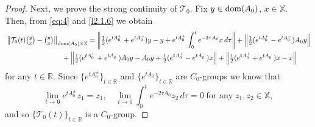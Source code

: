 \documentclass[11pt]{amsart}
\numberwithin{equation}{section}
\newcommand{\RR}{{\mathbb R}}
\theoremstyle{remark}
\theoremstyle{definition}
\newcommand\cT{{\mathcal T}}
\newcommand\bX{{\mathbb X}}
\newcommand{\dom}{\text{\rm{dom}}}
\begin{document}
\begin{proof}
	Next, we prove the strong continuity of $\cT_0$. Fix $y\in\dom(A_0)$, $x\in \bX$. Then, from \eqref{eq:4} and \eqref{l2.1.6} we obtain 
	\begin{align}\label{2.1.14}
		&\left\|\cT_0(t)\tbinom{y}{x}-\tbinom{y}{x}\right\|_{\dom(A_0)\times\bX}=\left\|\tfrac{1}{2}(e^{tA_0^+}+e^{tA_0^-})y-y
		+e^{tA_0^+}\int_0^t e^{-2\tau A_0}x\,d\tau\right\|+\left\|\tfrac{1}{2}(e^{tA_0^+}-e^{tA_0^-})A_0 y\right\|
		\nonumber\\
		&\qquad\qquad\qquad\qquad+\left\|\tfrac{1}{2}(e^{tA_0^+}+e^{tA_0^-})A_0y-A_0y
		+\tfrac{1}{2}(e^{tA_0^+}-e^{tA_0^-})x\right\|   
		+\left\|\tfrac{1}{2}(e^{tA_0^+}+e^{tA_0^-})x-x\right\|
	\end{align}
	for any $t\in\RR$. Since $\{e^{tA_0^\pm}\}_{t\in\RR}$ and $\{e^{tA_0}\}_{t\in\RR}$ are $C_0$-groups we know that
	\begin{equation}\label{2.1.15}
		\lim_{t\to0}e^{tA_0^\pm}z_1=z_1,\quad\lim_{t\to0}\int_0^t e^{-2\tau A_0}z_2\,d\tau=0
		\;\mbox{for any}\;z_1,z_2\in\bX,
	\end{equation}
	and so $\{\cT_0(t)\}_{t\in\RR}$ is a $C_0$-group.
	

\end{proof}
\end{document}
